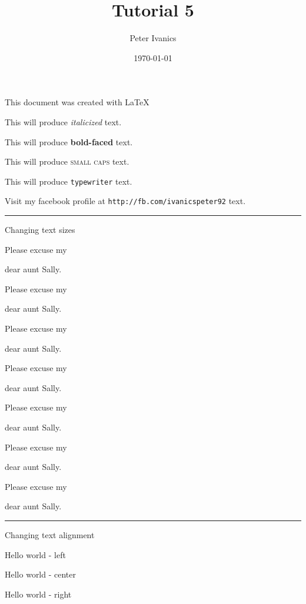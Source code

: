 \documentclass[11]{article}
\begin{document}
	\title{Tutorial 5}
	\author{Peter Ivanics}
	\date{\today}
	\maketitle
	
	\begin{center}
		This document was 	created with \LaTeX
	\end{center}	 
	
	This will produce \textit{italicized} text. 
	
	This will produce \textbf{bold-faced} text. 
	
	This will produce \textsc{small caps} text.
	 
	This will produce \texttt{typewriter} text. 
	
	Visit my facebook profile at \texttt{http://fb.com/ivanicspeter92} text.
	\hrule
	Changing text sizes
	
	Please excuse my \begin{large}dear aunt Sally.\end{large}
	
	Please excuse my \begin{Large}dear aunt Sally.\end{Large}
	
	Please excuse my \begin{LARGE}dear aunt Sally.\end{LARGE}
	
	Please excuse my \begin{huge}dear aunt Sally.\end{huge}
	
	Please excuse my \begin{Huge}dear aunt Sally.\end{Huge}
	
	Please excuse my \begin{small}dear aunt Sally.\end{small}
	
	Please excuse my \begin{tiny}dear aunt Sally.\end{tiny} 
	\hrule
	Changing text alignment
	\begin{flushleft}Hello world - left\end{flushleft}
	\begin{center}Hello world - center\end{center}
	\begin{flushright}Hello world - right\end{flushright}
\end{document}
